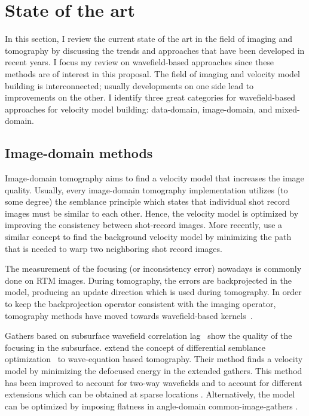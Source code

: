 \section{State of the art}

In this section, I review the current state of the art in the field
of imaging and tomography by discussing the trends and approaches
that have been developed in recent years. I focus my review on
wavefield-based approaches since these methods are of interest in
this proposal. The field of imaging and velocity model building is
interconnected; usually developments on one side lead to improvements
on the other. I identify three great categories for wavefield-based
approaches for velocity model building: data-domain, image-domain,
and mixed-domain.


\subsection{Image-domain methods}

 Image-domain tomography aims to find a velocity model that
increases the image quality. Usually, every image-domain tomography
implementation utilizes (to some degree) the semblance principle
\citep{Alyahya1989VAiterativeProfileMig} which states that individual
shot record images must be similar to each other. Hence, the velocity
model is optimized by improving the consistency between shot-record
images. More recently, \cite{perrone2015waveform} use a similar
concept to find the background velocity model by minimizing the path
that is needed to warp two neighboring shot record images.


The measurement of the focusing (or inconsistency error)
nowadays is commonly done on RTM images. During tomography,
the errors are backprojected in the model, producing an
update direction which is used during tomography. In order to
keep the backprojection operator consistent with the imaging
operator, tomography methods have moved towards wavefield-based
kernels~\citep{Woodward_1992,SavaBiondi.gp.wemva1,SavaBiondi.gp.wemva
2,
ShenSymes.geo.2008,Xie2008FiniteFreqSensitityKernel,Wiktor,tony_seg:c
wp12,perrone2015waveform}.

Gathers based on subsurface wavefield correlation
lag~\citep{rickett:883,sava:S209,GPR:GPR888} show
the quality of the focusing in the subsurface.
\cite{ShenSymes.geo.2008} extend the concept of differential
semblance optimization~\citep{symes.carazzone} to wave-equation
based tomography. Their method finds a velocity model by
minimizing the defocused energy in the extended gathers. This
method has been improved to account for two-way wavefields
\citep{Wiktor,tony_seg:cwp12,Shan:chevron,BiondiAli:2014,diaz2015}
and to account for different extensions which can be obtained at
sparse locations \citep{tony:gp15}. Alternatively, the model can be
optimized by imposing flatness in angle-domain common-image-gathers
\citep{ursin,biondiAngle,Liu2010,Montel,yiShen}.


